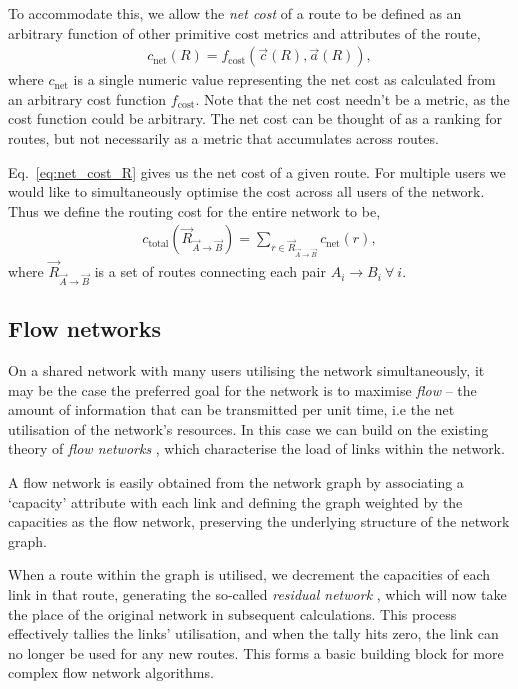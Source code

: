 \documentclass[aps,rmp,twocolumn,amsmath,amssymb,nofootinbib,superscriptaddress]{revtex4}
\begin{document}
To accommodate this, we allow the \emph{net cost} of a route to be defined as an arbitrary function of other primitive cost metrics and attributes of the route,
\begin{align} \label{eq:net_cost_R}
c_\mathrm{net}(R) = f_\mathrm{cost}(\vec{c}(R),\vec{a}(R)),
\end{align}
where $c_\mathrm{net}$ is a single numeric value representing the net cost as calculated from an arbitrary cost function $f_\mathrm{cost}$. Note that the net cost needn't be a metric, as the cost function could be arbitrary. The net cost can be thought of as a ranking for routes, but not necessarily as a metric that accumulates across routes.

Eq.~\ref{eq:net_cost_R} gives us the net cost of a given route. For multiple users we would like to simultaneously optimise the cost across all users of the network. Thus we define the routing cost for the entire network to be,
\begin{align} \label{eq:c_total}
c_\mathrm{total}(\vec{R}_{\vec{A}\to \vec{B}}) = \sum_{r \in {\vec R}_{\vec{A}\to \vec{B}}} c_\mathrm{net}(r),
\end{align}
where $\vec{R}_{\vec{A}\to \vec{B}}$ is a set of routes connecting each pair \mbox{$A_i\to B_i~\forall ~ i$}.

%
%

\subsection{Flow networks} \label{sec:flow_networks}

On a shared network with many users utilising the network simultaneously, it may be the case the preferred goal for the network is to maximise \emph{flow} \cite{???} -- the amount of information that can be transmitted per unit time, i.e the net utilisation of the network's resources. In this case we can build on the existing theory of \emph{flow networks} \cite{???}, which characterise the load of links within the network.

A flow network is easily obtained from the network graph by associating a `capacity' attribute with each link and defining the graph weighted by the capacities as the flow network, preserving the underlying structure of the network graph.

When a route within the graph is utilised, we decrement the capacities of each link in that route, generating the so-called \emph{residual network} \cite{???}, which will now take the place of the original network in subsequent calculations. This process effectively tallies the links' utilisation, and when the tally hits zero, the link can no longer be used for any new routes. This forms a basic building block for more complex flow network algorithms.
\end{document}
